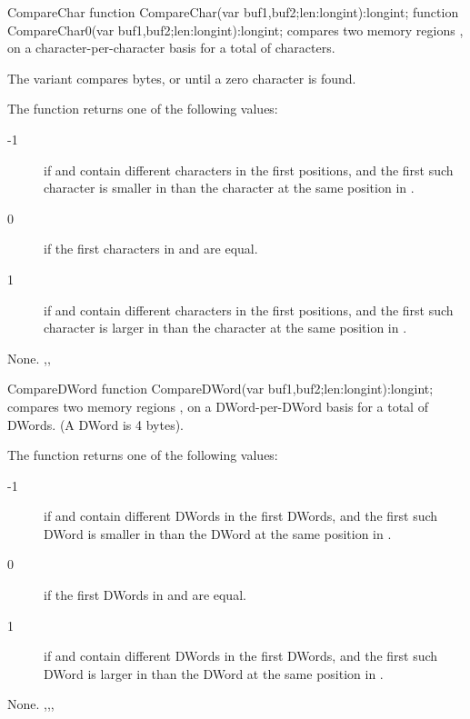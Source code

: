 \begin{function}{CompareChar}
\Declaration
function  CompareChar(var buf1,buf2;len:longint):longint;
function  CompareChar0(var buf1,buf2;len:longint):longint;
\Description
{} compares two memory regions , on a
character-per-character basis for a total of  characters.

The  variant compares  bytes, or until
a zero character is found.

The function returns one of the following values:
\begin{description}
\item[-1] if  and  contain different characters
in the first  positions, and the first such character is smaller in 
than the character at the same position in .
\item[0]  if the first  characters in  and  are
equal.
\item [1] if  and  contain different characters
in the first  positions, and the first such character is larger in
 than the character at the same position in .
\end{description}

\Errors
None.
\SeeAlso
{},,
\end{function}


\begin{function}{CompareDWord}
\Declaration
function  CompareDWord(var buf1,buf2;len:longint):longint;
\Description
{} compares two memory regions , on a
DWord-per-DWord basis for a total of  DWords. (A DWord is 4 bytes).

The function returns one of the following values:
\begin{description}
\item[-1] if  and  contain different DWords
in the first  DWords, and the first such DWord is smaller in 
than the DWord at the same position in .
\item[0]  if the first  DWords in  and  are
equal.
\item [1] if  and  contain different DWords
in the first  DWords, and the first such DWord is larger in 
than the DWord at the same position in .
\end{description}
\Errors
None.
\SeeAlso
{},,,
\end{function}

